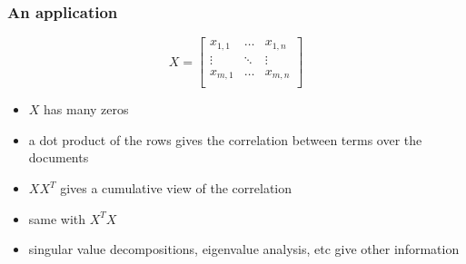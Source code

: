 \documentclass[10pt]{beamer}
\begin{document}
\begin{frame}
\frametitle{An application}
\begin{equation*}
X=
    \begin{bmatrix}
    x_{1,1} & \dots & x_{1,n}\\
    \vdots & \ddots & \vdots\\
    x_{m,1} & \dots & x_{m,n}\\
    \end{bmatrix}
\end{equation*}
\begin{itemize}
    \item $X$ has many zeros
    \item a dot product of the rows gives the correlation between terms over the
documents
    \item $XX^T$ gives a cumulative view of the correlation
    \item same with $X^T X$
    \item singular value decompositions, eigenvalue analysis, etc give other
information
\end{itemize}
    
\end{frame}
\end{document}
